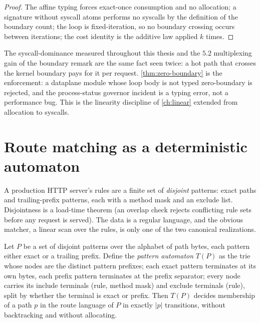 \begin{proof}
The affine typing forces exact-once consumption and no allocation; a
signature without syscall atoms performs no syscalls by the definition
of the boundary count; the loop is fixed-iteration, so no boundary
crossing occurs between iterations; the cost identity is the additive
law applied $k$ times.
\end{proof}

\begin{remark}
The syscall-dominance measured throughout this thesis and the $5.2$
multiplexing gain of the boundary remark are the same fact seen twice:
a hot path that crosses the kernel boundary pays for it per request.
\autoref{thm:zero-boundary} is the enforcement: a dataplane module
whose loop body is not typed zero-boundary is rejected, and the
process-status governor incident is a typing error, not a performance
bug. This is the linearity discipline of \autoref{ch:linear} extended
from allocation to syscalls.
\end{remark}

\section{Route matching as a deterministic automaton}\label{sec:route-automaton}

A production HTTP server's rules are a finite set of \emph{disjoint}
patterns: exact paths and trailing-prefix patterns, each with a method
mask and an exclude list. Disjointness is a load-time theorem (an
overlap check rejects conflicting rule sets before any request is
served). The data is a regular language, and the obvious matcher, a
linear scan over the rules, is only one of the two canonical
realizations.

\begin{theorem}\label{thm:route-dfa}
Let $P$ be a set of disjoint patterns over the alphabet of path bytes,
each pattern either exact or a trailing prefix. Define the
\emph{pattern automaton} $T (P)$ as the trie whose nodes are the
distinct pattern prefixes; each exact pattern terminates at its own
bytes, each prefix pattern terminates at the prefix separator; every
node carries its include terminals (rule, method mask) and exclude
terminals (rule), split by whether the terminal is exact or prefix.
Then $T (P)$ decides membership of a path $p$ in the route language of
$P$ in exactly $|p|$ transitions, without backtracking and without
allocating.
\end{theorem}

